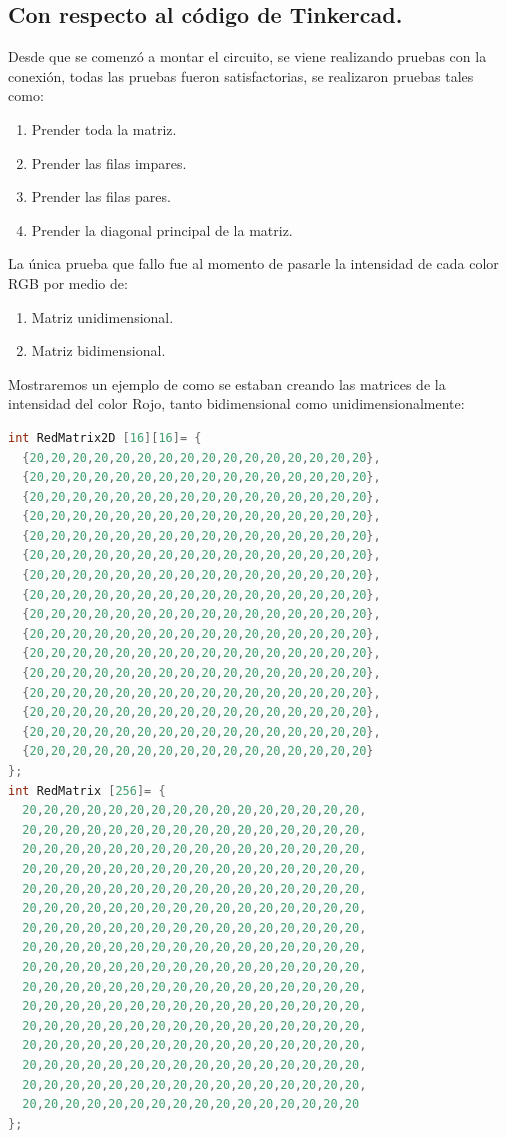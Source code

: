 \documentclass{article}
\begin{document}
\subsection{Con respecto al código de Tinkercad.}

Desde que se comenzó a montar el circuito, se viene realizando pruebas con la conexión, todas las pruebas fueron satisfactorias, se realizaron pruebas tales como:
\begin{enumerate}
    \item Prender toda la matriz.
    \item Prender las filas impares.
    \item Prender las filas pares.
    \item Prender la diagonal principal de la matriz.
\end{enumerate}
La única prueba que fallo fue al momento de pasarle la intensidad de cada color RGB por medio de:
\begin{enumerate}
    \item Matriz unidimensional.
    \item Matriz bidimensional.
\end{enumerate}
Mostraremos un ejemplo de como se estaban creando las matrices de la intensidad del color Rojo, tanto bidimensional como unidimensionalmente:
\begin{lstlisting}[language=C++, label=codigo_matrices_int]
int RedMatrix2D [16][16]= {
  {20,20,20,20,20,20,20,20,20,20,20,20,20,20,20,20},
  {20,20,20,20,20,20,20,20,20,20,20,20,20,20,20,20},
  {20,20,20,20,20,20,20,20,20,20,20,20,20,20,20,20},
  {20,20,20,20,20,20,20,20,20,20,20,20,20,20,20,20},
  {20,20,20,20,20,20,20,20,20,20,20,20,20,20,20,20},
  {20,20,20,20,20,20,20,20,20,20,20,20,20,20,20,20},
  {20,20,20,20,20,20,20,20,20,20,20,20,20,20,20,20},
  {20,20,20,20,20,20,20,20,20,20,20,20,20,20,20,20},
  {20,20,20,20,20,20,20,20,20,20,20,20,20,20,20,20},
  {20,20,20,20,20,20,20,20,20,20,20,20,20,20,20,20},
  {20,20,20,20,20,20,20,20,20,20,20,20,20,20,20,20},
  {20,20,20,20,20,20,20,20,20,20,20,20,20,20,20,20},
  {20,20,20,20,20,20,20,20,20,20,20,20,20,20,20,20},
  {20,20,20,20,20,20,20,20,20,20,20,20,20,20,20,20},
  {20,20,20,20,20,20,20,20,20,20,20,20,20,20,20,20},
  {20,20,20,20,20,20,20,20,20,20,20,20,20,20,20,20}
};
int RedMatrix [256]= {
  20,20,20,20,20,20,20,20,20,20,20,20,20,20,20,20,
  20,20,20,20,20,20,20,20,20,20,20,20,20,20,20,20,
  20,20,20,20,20,20,20,20,20,20,20,20,20,20,20,20,
  20,20,20,20,20,20,20,20,20,20,20,20,20,20,20,20,
  20,20,20,20,20,20,20,20,20,20,20,20,20,20,20,20,
  20,20,20,20,20,20,20,20,20,20,20,20,20,20,20,20,
  20,20,20,20,20,20,20,20,20,20,20,20,20,20,20,20,
  20,20,20,20,20,20,20,20,20,20,20,20,20,20,20,20,
  20,20,20,20,20,20,20,20,20,20,20,20,20,20,20,20,
  20,20,20,20,20,20,20,20,20,20,20,20,20,20,20,20,
  20,20,20,20,20,20,20,20,20,20,20,20,20,20,20,20,
  20,20,20,20,20,20,20,20,20,20,20,20,20,20,20,20,
  20,20,20,20,20,20,20,20,20,20,20,20,20,20,20,20,
  20,20,20,20,20,20,20,20,20,20,20,20,20,20,20,20,
  20,20,20,20,20,20,20,20,20,20,20,20,20,20,20,20,
  20,20,20,20,20,20,20,20,20,20,20,20,20,20,20,20
};
\end{lstlisting}
\end{document}
